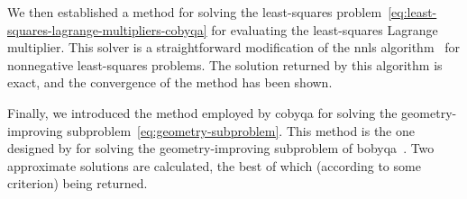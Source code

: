 We then established a method for solving the least-squares problem~\cref{eq:least-squares-lagrange-multipliers-cobyqa} for evaluating the least-squares Lagrange multiplier.
This solver is a straightforward modification of the \gls{nnls} algorithm~\cite[Alg.~23.10]{Lawson_Hanson_1987} for nonnegative least-squares problems.
The solution returned by this algorithm is exact, and the convergence of the method has been shown.

Finally, we introduced the method employed by \gls{cobyqa} for solving the geometry-improving subproblem~\cref{eq:geometry-subproblem}.
This method is the one designed by \citeauthor{Powell_2009} for solving the geometry-improving subproblem of \gls{bobyqa}~\cite{Powell_2009}.
Two approximate solutions are calculated, the best of which (according to some criterion) being returned.
